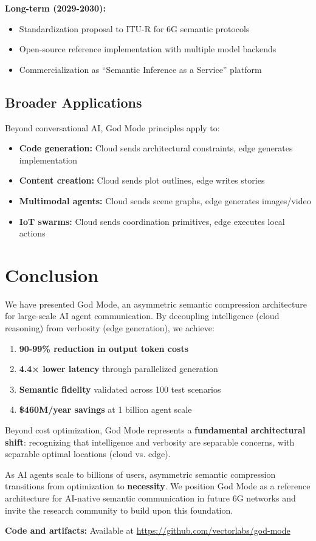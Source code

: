 \documentclass{article}
\begin{document}
\textbf{Long-term (2029-2030):}
\begin{itemize}
    \item Standardization proposal to ITU-R for 6G semantic protocols
    \item Open-source reference implementation with multiple model backends
    \item Commercialization as ``Semantic Inference as a Service'' platform
\end{itemize}

\subsection{Broader Applications}

Beyond conversational AI, God Mode principles apply to:
\begin{itemize}
    \item \textbf{Code generation:} Cloud sends architectural constraints, edge generates implementation
    \item \textbf{Content creation:} Cloud sends plot outlines, edge writes stories
    \item \textbf{Multimodal agents:} Cloud sends scene graphs, edge generates images/video
    \item \textbf{IoT swarms:} Cloud sends coordination primitives, edge executes local actions
\end{itemize}

\section{Conclusion}

We have presented God Mode, an asymmetric semantic compression architecture for large-scale AI agent communication. By decoupling intelligence (cloud reasoning) from verbosity (edge generation), we achieve:

\begin{enumerate}
    \item \textbf{90-99\% reduction in output token costs}
    \item \textbf{4.4× lower latency} through parallelized generation
    \item \textbf{Semantic fidelity} validated across 100 test scenarios
    \item \textbf{\$460M/year savings} at 1 billion agent scale
\end{enumerate}

Beyond cost optimization, God Mode represents a \textbf{fundamental architectural shift}: recognizing that intelligence and verbosity are separable concerns, with separable optimal locations (cloud vs. edge).

As AI agents scale to billions of users, asymmetric semantic compression transitions from optimization to \textbf{necessity}. We position God Mode as a reference architecture for AI-native semantic communication in future 6G networks and invite the research community to build upon this foundation.

\textbf{Code and artifacts:} Available at \url{https://github.com/vectorlabs/god-mode}



\end{document}
